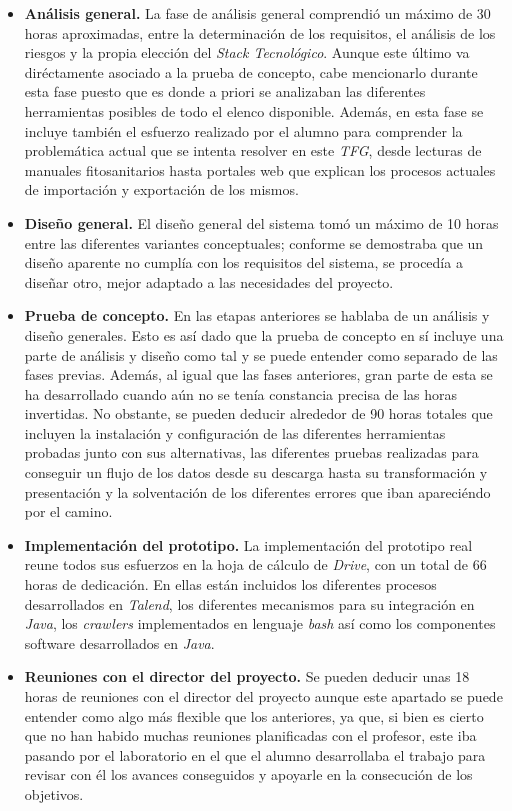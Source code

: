 \begin{itemize}
\item \textbf{Análisis general. } La fase de análisis general comprendió un máximo de 30 horas aproximadas, entre la determinación de los requisitos, el análisis de los riesgos y la propia elección del \textit{Stack Tecnológico}. Aunque este último va diréctamente asociado a la prueba de concepto, cabe mencionarlo durante esta fase puesto que es donde a priori se analizaban las diferentes herramientas posibles de todo el elenco disponible. Además, en esta fase se incluye también el esfuerzo realizado por el alumno para comprender la problemática actual que se intenta resolver en este \textit{TFG}, desde lecturas de manuales fitosanitarios hasta portales web que explican los procesos actuales de importación y exportación de los mismos.
\item \textbf{Diseño general. } El diseño general del sistema tomó un máximo de 10 horas entre las diferentes variantes conceptuales; conforme se demostraba que un diseño aparente no cumplía con los requisitos del sistema, se procedía a diseñar otro, mejor adaptado a las necesidades del proyecto. 
\item \textbf{Prueba de concepto. } En las etapas anteriores se hablaba de un análisis y diseño generales. Esto es así dado que la prueba de concepto en sí incluye una parte de análisis y diseño como tal y se puede entender como separado de las fases previas. Además, al igual que las fases anteriores, gran parte de esta se ha desarrollado cuando aún no se tenía constancia precisa de las horas invertidas. No obstante, se pueden deducir alrededor de 90 horas totales que incluyen la instalación y configuración de las diferentes herramientas probadas junto con sus alternativas, las diferentes pruebas realizadas para conseguir un flujo de los datos desde su descarga hasta su transformación y presentación y la solventación de los diferentes errores que iban apareciéndo por el camino. 
\item \textbf{Implementación del prototipo. } La implementación del prototipo real reune todos sus esfuerzos en la hoja de cálculo de \textit{Drive}, con un total de 66 horas de dedicación. En ellas están incluidos los diferentes procesos desarrollados en \textit{Talend}, los diferentes mecanismos para su integración en \textit{Java}, los \textit{crawlers} implementados en lenguaje \textit{bash} así como los  componentes software desarrollados en \textit{Java}. 
\item \textbf{Reuniones con el director del proyecto. } Se pueden deducir unas 18 horas de reuniones con el director del proyecto aunque este apartado se puede entender como algo más flexible que los anteriores, ya que, si bien es cierto que no han habido muchas reuniones planificadas con el profesor, este iba pasando por el laboratorio en el que el alumno desarrollaba el trabajo para revisar con él los avances conseguidos y apoyarle en la consecución de los objetivos. 

\end{itemize}
